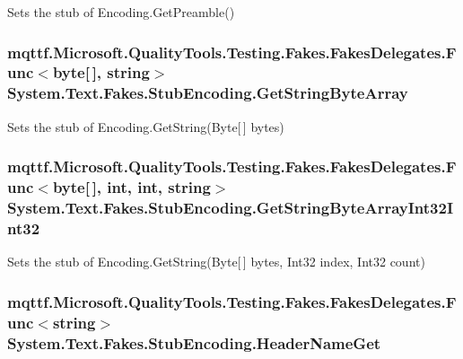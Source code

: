 Sets the stub of Encoding.\-Get\-Preamble()

\hypertarget{class_system_1_1_text_1_1_fakes_1_1_stub_encoding_a08e57f47b77dc74fd63dedc5b929dc1e}{
\subsubsection[{Get\-String\-Byte\-Array}]{\setlength{\rightskip}{0pt plus 5cm}mqttf.\-Microsoft.\-Quality\-Tools.\-Testing.\-Fakes.\-Fakes\-Delegates.\-Func$<$byte\mbox{[}$\,$\mbox{]}, string$>$ System.\-Text.\-Fakes.\-Stub\-Encoding.\-Get\-String\-Byte\-Array}}\label{class_system_1_1_text_1_1_fakes_1_1_stub_encoding_a08e57f47b77dc74fd63dedc5b929dc1e}


Sets the stub of Encoding.\-Get\-String(\-Byte\mbox{[}$\,$\mbox{]} bytes)

\hypertarget{class_system_1_1_text_1_1_fakes_1_1_stub_encoding_afda397423974c11f212ecbcdd58812c1}{
\subsubsection[{Get\-String\-Byte\-Array\-Int32\-Int32}]{\setlength{\rightskip}{0pt plus 5cm}mqttf.\-Microsoft.\-Quality\-Tools.\-Testing.\-Fakes.\-Fakes\-Delegates.\-Func$<$byte\mbox{[}$\,$\mbox{]}, int, int, string$>$ System.\-Text.\-Fakes.\-Stub\-Encoding.\-Get\-String\-Byte\-Array\-Int32\-Int32}}\label{class_system_1_1_text_1_1_fakes_1_1_stub_encoding_afda397423974c11f212ecbcdd58812c1}


Sets the stub of Encoding.\-Get\-String(\-Byte\mbox{[}$\,$\mbox{]} bytes, Int32 index, Int32 count)

\hypertarget{class_system_1_1_text_1_1_fakes_1_1_stub_encoding_a43ce2beffe5ca4a9b07a07fb0e79e6b6}{
\subsubsection[{Header\-Name\-Get}]{\setlength{\rightskip}{0pt plus 5cm}mqttf.\-Microsoft.\-Quality\-Tools.\-Testing.\-Fakes.\-Fakes\-Delegates.\-Func$<$string$>$ System.\-Text.\-Fakes.\-Stub\-Encoding.\-Header\-Name\-Get}}\label{class_system_1_1_text_1_1_fakes_1_1_stub_encoding_a43ce2beffe5ca4a9b07a07fb0e79e6b6}


